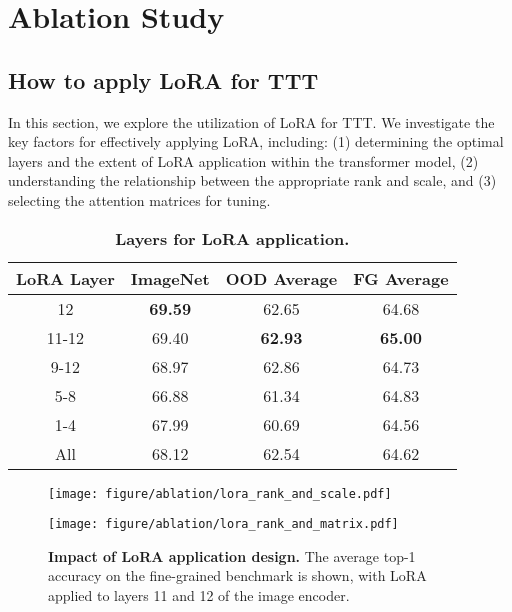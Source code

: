 \section{Ablation Study}
\label{sec:ablation}

\subsection{How to apply LoRA for TTT}
\label{abs:lora}
In this section, we explore the utilization of LoRA for TTT.
We investigate the key factors for effectively applying LoRA, including: (1) determining the optimal layers and the extent of LoRA application within the transformer model, (2) understanding the relationship between the appropriate rank and scale, and (3) selecting the attention matrices for tuning.
\newline

\begin{table}[t]
\centering
\caption{\textbf{Layers for LoRA application.}}
\label{tab:layer}
\begin{adjustbox}{width=0.8\linewidth}
\begin{tabular}{c|ccc}
\toprule
\rowcolor{gray!10} \textbf{LoRA Layer} & \textbf{ImageNet} & \textbf{OOD Average} & \textbf{FG Average} \\
\midrule
12 & \textbf{69.59} & 62.65 & 64.68 \\
\rowcolor{blue!10} 11-12 & 69.40 & \textbf{62.93} & \textbf{65.00} \\
9-12 & 68.97 & 62.86 & 64.73 \\
5-8 & 66.88 & 61.34 & 64.83 \\
1-4 & 67.99 & 60.69 & 64.56 \\
All & 68.12 & 62.54 & 64.62 \\
\bottomrule
\end{tabular}
\end{adjustbox}
\end{table}


\begin{figure}[t]
    \centering
    \begin{minipage}{0.49\linewidth}
        \centering
        \texttt{[image: figure/ablation/lora\_rank\_and\_scale.pdf]}
        \label{fig:lora_rank_scale}
    \end{minipage}
    \hfill
    \begin{minipage}{0.49\linewidth}
        \centering
        \texttt{[image: figure/ablation/lora\_rank\_and\_matrix.pdf]}
        \label{fig:lora_rank_matrix}
    \end{minipage}
    \caption{\textbf{Impact of LoRA application design.} The average top-1 accuracy on the fine-grained benchmark is shown, with LoRA applied to layers 11 and 12 of the image encoder.}
    \label{fig:lora}
\end{figure}

